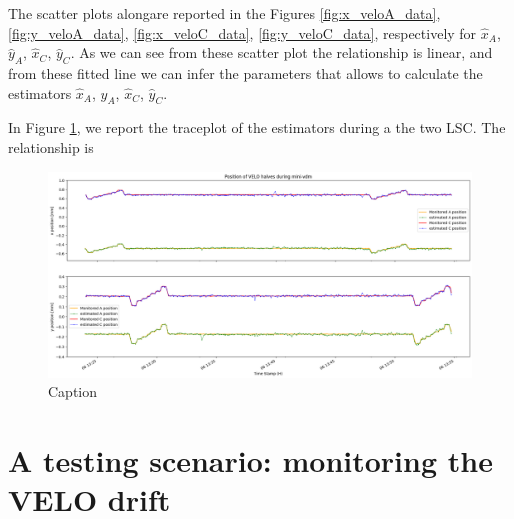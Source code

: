 The scatter plots alongare reported in the Figures \ref{fig:x_veloA_data}, \ref{fig:y_veloA_data}, \ref{fig:x_veloC_data}, \ref{fig:y_veloC_data}, respectively for $\hat{x}_A$, $\hat{y}_A$, $\hat{x}_C$, $\hat{y}_C$. As we can see from these scatter plot the relationship is linear, and from these fitted line we can infer the parameters that allows to calculate the estimators $\hat{x}_A$, $\hat{y}_A$, $\hat{x}_C$, $\hat{y}_C$.

In Figure \ref{fig:traceplot_xy}, we report the traceplot of the estimators during a the two LSC. The relationship is 

\begin{figure}
    \centering
    \includegraphics[width=\textwidth]{figures/traceplot_xy.png}
    \caption{Caption}
    \label{fig:traceplot_xy}
\end{figure}

\section{A testing scenario: monitoring the VELO drift}
